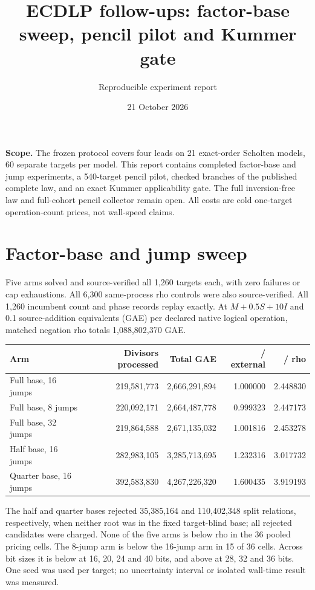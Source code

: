 \documentclass[10pt]{article}
\title{ECDLP follow-ups: factor-base sweep, pencil pilot and Kummer gate}
\author{Reproducible experiment report}
\date{21 October 2026}
\begin{document}
\maketitle
\noindent\textbf{Scope.} The frozen protocol covers four leads on 21 exact-order
Scholten models, 60 separate targets per model. This report contains completed
factor-base and jump experiments, a 540-target pencil pilot, checked branches of
the published complete law, and an exact Kummer applicability gate. The full inversion-free law and full-cohort
pencil collector remain open.
All costs are cold one-target operation-count prices, not wall-speed claims.

\section*{Factor-base and jump sweep}
Five arms solved and source-verified all 1,260 targets each, with zero failures
or cap exhaustions. All 6,300 same-process rho controls were also source-verified.
All 1,260 incumbent count and phase records replay exactly.
At $M+0.5S+10I$ and 0.1 source-addition equivalents (GAE) per declared native
logical operation, matched negation rho totals 1,088,802,370 GAE.

\begin{center}\small
\begin{tabular}{lrrrr}
\toprule
Arm & Divisors processed & Total GAE & / external & / rho \\
\midrule
Full base, 16 jumps & 219,581,773 & 2,666,291,894 & 1.000000 & 2.448830 \\
Full base, 8 jumps & 220,092,171 & 2,664,487,778 & 0.999323 & 2.447173 \\
Full base, 32 jumps & 219,864,588 & 2,671,135,032 & 1.001816 & 2.453278 \\
Half base, 16 jumps & 282,983,105 & 3,285,713,695 & 1.232316 & 3.017732 \\
Quarter base, 16 jumps & 392,583,830 & 4,267,226,320 & 1.600435 & 3.919193 \\
\bottomrule
\end{tabular}
\end{center}

The half and quarter bases rejected 35,385,164 and 110,402,348 split
relations, respectively, when neither root was in the fixed target-blind
base; all rejected candidates were charged. None of the five arms is below
rho in the 36 pooled pricing cells. The 8-jump arm is below the 16-jump arm
in 15 of 36 cells. Across bit sizes it is below at 16, 20, 24 and 40 bits,
and above at 28, 32 and 36 bits. One seed was used per target; no uncertainty
interval or isolated wall-time result was measured.
\end{document}
